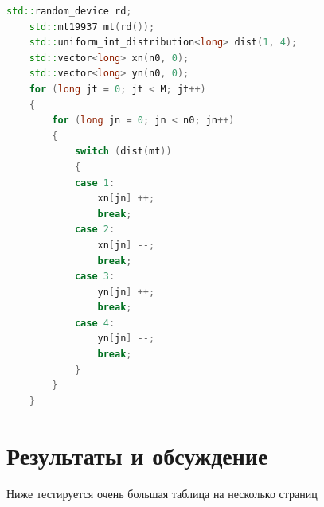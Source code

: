 \documentclass[a4paper,14pt]{extarticle}
\begin{document}
\begin{lstlisting}[language=C++,caption={Подпрограмма случайного блуждания на плоскости},label={listing-2}]
    std::random_device rd;
    std::mt19937 mt(rd());
    std::uniform_int_distribution<long> dist(1, 4);
    std::vector<long> xn(n0, 0);
    std::vector<long> yn(n0, 0);
    for (long jt = 0; jt < M; jt++)
    {
        for (long jn = 0; jn < n0; jn++)
        {
            switch (dist(mt))
            {
            case 1:
                xn[jn] ++;
                break;
            case 2:
                xn[jn] --;
                break;
            case 3:
                yn[jn] ++;
                break;
            case 4:
                yn[jn] --;
                break;
            }
        }
    }
    \end{lstlisting}

\pagebreak
\section{Результаты и обсуждение}

Ниже тестируется очень большая таблица на несколько страниц
\end{document}
